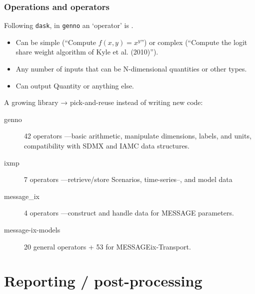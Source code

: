 \documentclass[12pt,aspectratio=169]{beamer}
\renewcommand{\mod}[1]{\texttt{#1}}
\begin{document}
\begin{frame}
\frametitle{Operations and operators}

Following \mod{dask}, in \mod{genno} an ‘operator’ is .
\begin{itemize}
  \item Can be simple (“Compute $f(x,y) = x^y$”) or complex (“Compute the logit share weight algorithm of Kyle et al. (2010)”).
  \item Any number of inputs that can be N-dimensional quantities or other types.
  \item Can output Quantity or anything else.
\end{itemize}

\medskip
A growing library → pick-and-reuse instead of writing new code:
\begin{description}
  \item [\ttfamily genno] 42 operators%
    —basic arithmetic,
    manipulate dimensions, labels, and units,
    compatibility with SDMX and IAMC data structures.
  \item [\ttfamily ixmp] 7 operators%
    —retrieve/store Scenarios, time-series–, and model data
  \item [\ttfamily message\_ix] 4 operators%
    —construct and handle data for MESSAGE parameters.
  \item [\ttfamily message-ix-models] 20 general operators + 53 for MESSAGEix-Transport.
\end{description}
\end{frame}

\section{Reporting / post-processing}
\end{document}
